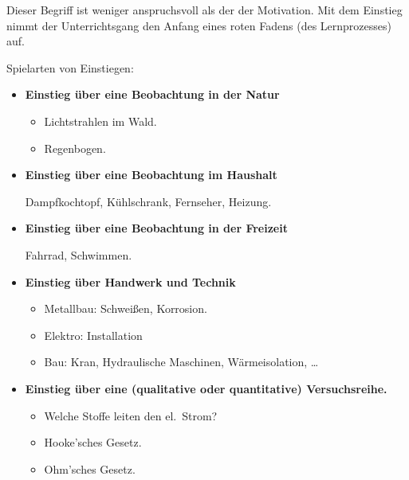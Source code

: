 Dieser Begriff ist weniger anspruchsvoll als der der Motivation.
Mit dem Einstieg nimmt der Unterrichtsgang den Anfang eines
roten Fadens (des Lernprozesses) auf.

Spielarten von Einstiegen:
\begin{itemize}
	\item
	{\bf Einstieg \"{u}ber eine Beobachtung in der Natur}
	\begin{beisp2}
		\begin{itemize}
		\item
		Lichtstrahlen im Wald.
		\item
		Regenbogen.
		\end{itemize}

	\end{beisp2}
	
	
	\item {\bf	Einstieg \"{u}ber eine Beobachtung im Haushalt}
	\begin{beisp2}
		Dampfkochtopf, K\"{u}hlschrank, Fernseher, Heizung.
	\end{beisp2}
	
	\item {\bf Einstieg \"{u}ber eine Beobachtung in der Freizeit}
	\begin{beisp2}
		Fahrrad, Schwimmen.
	\end{beisp2}
	
	\item {\bf 	Einstieg \"{u}ber Handwerk und Technik}
	\begin{beisp2}
			\begin{itemize}
	\item
	Metallbau: Schwei{\ss}en, Korrosion.
	\item
	Elektro: Installation
	\item
	Bau: Kran, Hydraulische Maschinen, W\"{a}rmeisolation, \dots
	\end{itemize}
	
	\end{beisp2}

	\item {\bf
	Einstieg \"{u}ber eine (qualitative oder quantitative)
	Versuchsreihe.}
	\begin{beisp2}
		\begin{itemize}
			\item
			Welche Stoffe leiten den el.\ Strom?
			\item
			Hooke'sches Gesetz.
			\item
			Ohm'sches Gesetz.
	\end{itemize}
	\end{beisp2}


\end{itemize}

